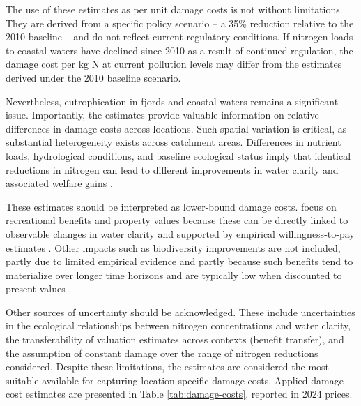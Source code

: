 \documentclass[12pt]{article}
\begin{document}
The use of these estimates as per unit damage costs is not without limitations. They are derived from a specific policy scenario -- a 35\% reduction relative to the 2010 baseline -- and do not reflect current regulatory conditions. If nitrogen loads to coastal waters have declined since 2010 as a result of continued regulation, the damage cost per kg N at current pollution levels may differ from the estimates derived under the 2010 baseline scenario.




Nevertheless, eutrophication in fjords and coastal waters remains a significant issue. Importantly, the estimates provide valuable information on relative differences in damage costs across locations. Such spatial variation is critical, as substantial heterogeneity exists across catchment areas. Differences in nutrient loads, hydrological conditions, and baseline ecological status imply that identical reductions in nitrogen can lead to different improvements in water clarity and associated welfare gains \citep{andersen2019}.



These estimates should be interpreted as lower-bound damage costs. \cite{andersen2019} focus on recreational benefits and property values because these can be directly linked to observable changes in water clarity and supported by empirical willingness-to-pay estimates \citep{andersen2019}. Other impacts such as biodiversity improvements are not included, partly due to limited empirical evidence and partly because such benefits tend to materialize over longer time horizons and are typically low when discounted to present values \citep{andersen2019}.



Other sources of uncertainty should be acknowledged. These include uncertainties in the ecological relationships between nitrogen concentrations and water clarity, the transferability of valuation estimates across contexts (benefit transfer), and the assumption of constant damage over the range of nitrogen reductions considered. Despite these limitations, the estimates are considered the most suitable available for capturing location-specific damage costs. Applied damage cost estimates are presented in Table \ref{tab:damage-costs}, reported in 2024 prices. 
\end{document}
